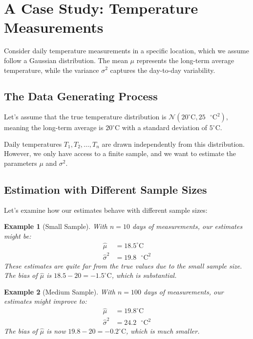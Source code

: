 \documentclass{article}
\newtheorem{example}{Example}
\begin{document}
\section{A Case Study: Temperature Measurements}

Consider daily temperature measurements in a specific location, which we assume follow a Gaussian distribution. The mean $\mu$ represents the long-term average temperature, while the variance $\sigma^2$ captures the day-to-day variability.

\subsection{The Data Generating Process}

Let's assume that the true temperature distribution is $\mathcal{N}(20^\circ\text{C}, 25\text{ }^\circ\text{C}^2)$, meaning the long-term average is $20^\circ\text{C}$ with a standard deviation of $5^\circ\text{C}$.

Daily temperatures $T_1, T_2, \ldots, T_n$ are drawn independently from this distribution. However, we only have access to a finite sample, and we want to estimate the parameters $\mu$ and $\sigma^2$.

\subsection{Estimation with Different Sample Sizes}

Let's examine how our estimates behave with different sample sizes:

\begin{example}[Small Sample]
With $n = 10$ days of measurements, our estimates might be:
\begin{align*}
\hat{\mu} &= 18.5^\circ\text{C} \\
\hat{\sigma}^2 &= 19.8\text{ }^\circ\text{C}^2
\end{align*}
These estimates are quite far from the true values due to the small sample size. The bias of $\hat{\mu}$ is $18.5 - 20 = -1.5^\circ\text{C}$, which is substantial.
\end{example}

\begin{example}[Medium Sample]
With $n = 100$ days of measurements, our estimates might improve to:
\begin{align*}
\hat{\mu} &= 19.8^\circ\text{C} \\
\hat{\sigma}^2 &= 24.2\text{ }^\circ\text{C}^2
\end{align*}
The bias of $\hat{\mu}$ is now $19.8 - 20 = -0.2^\circ\text{C}$, which is much smaller.
\end{example}
\end{document}
